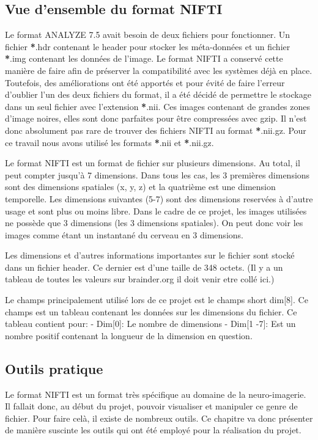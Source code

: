 \documentclass[a4paper,10pt,openany,oneside]{sphinxmanual}
\begin{document}
\subsection{Vue d'ensemble du format NIFTI}
\label{index:vue-d-ensemble-du-format-nifti}
Le format ANALYZE 7.5 avait besoin de deux fichiers pour fonctionner. Un fichier {\color{red}\bfseries{}*}.hdr contenant
le header pour stocker les méta-données et un fichier {\color{red}\bfseries{}*}.img contenant les données de l'image.
Le format NIFTI a conservé cette manière de faire afin de préserver la compatibilité avec les
systèmes déjà en place. Toutefois, des améliorations ont été apportés et pour évité de faire
l'erreur d'oublier l'un des deux fichiers du format, il a été décidé de permettre le stockage
dans un seul fichier avec l'extension {\color{red}\bfseries{}*}.nii. Ces images contenant de grandes zones d'image
noires, elles sont donc parfaites pour être compressées avec gzip. Il n'est donc absolument
pas rare de trouver des fichiers NIFTI au format {\color{red}\bfseries{}*}.nii.gz. Pour ce travail nous avons utilisé
les formats {\color{red}\bfseries{}*}.nii et {\color{red}\bfseries{}*}.nii.gz.

Le format NIFTI est un format de fichier sur plusieurs dimensions. Au total, il peut compter
jusqu'à 7 dimensions. Dans tous les cas, les 3 premières dimensions sont des dimensions spatiales
(x, y, z) et la quatrième est une dimension temporelle. Les dimensions suivantes (5-7) sont des
dimensions reservées à d'autre usage et sont plus ou moins libre. Dans le cadre de ce projet,
les images utilisées ne possède que 3 dimensions (les 3 dimensions spatiales). On peut donc voir
les images comme étant un instantané du cerveau en 3 dimensions.

Les dimensions et d'autres informations importantes sur le fichier sont stocké dans un fichier
header. Ce dernier est d'une taille de 348 octets. (Il y a un tableau de toutes les valeurs sur
brainder.org il doit venir etre collé ici.)

Le champs principalement utilisé lors de ce projet est le champs short dim{[}8{]}. Ce champs est un
tableau contenant les données sur les dimensions du fichier. Ce tableau contient pour:
- Dim{[}0{]}: Le nombre de dimensions
- Dim{[}1 -7{]}: Est un nombre positif contenant la longueur de la dimension en question.


\subsection{Outils pratique}
\label{index:outils-pratique}
Le format NIFTI est un format très spécifique au domaine de la neuro-imagerie. Il fallait donc, au début
du projet, pouvoir visualiser et manipuler ce genre de fichier. Pour faire celà, il existe de nombreux outils.
Ce chapitre va donc présenter de manière suscinte les outils qui ont été employé pour la réalisation du projet.
\end{document}
